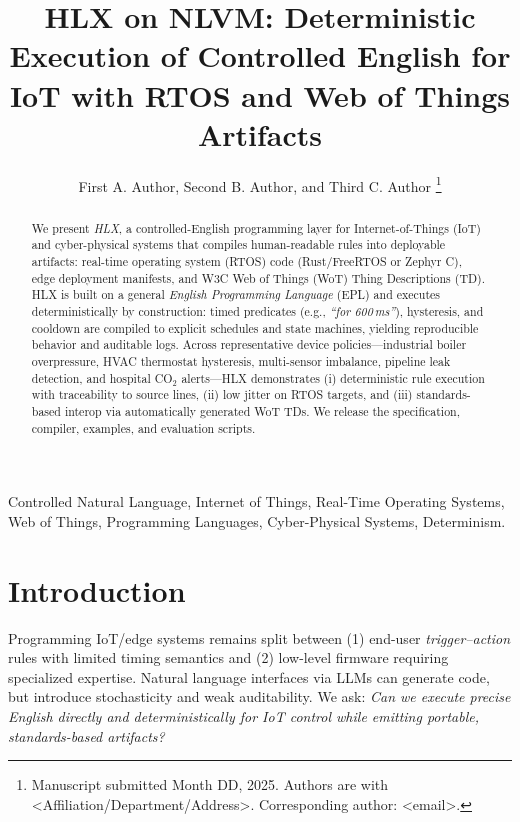 \documentclass[journal]{IEEEtran}
\begin{document}
\title{HLX on NLVM: Deterministic Execution of Controlled English for IoT with RTOS and Web of Things Artifacts}

\author{First A. Author, Second B. Author, and Third C. Author%
\thanks{Manuscript submitted Month DD, 2025. Authors are with <Affiliation/Department/Address>. Corresponding author: <email>.}}

\maketitle

\begin{abstract}
We present \emph{HLX}, a controlled-English programming layer for Internet-of-Things (IoT) and cyber-physical systems that compiles human-readable rules into deployable artifacts: real-time operating system (RTOS) code (Rust/FreeRTOS or Zephyr C), edge deployment manifests, and W3C Web of Things (WoT) Thing Descriptions (TD). HLX is built on a general \emph{English Programming Language} (EPL) and executes deterministically by construction: timed predicates (e.g., \emph{``for 600\,ms''}), hysteresis, and cooldown are compiled to explicit schedules and state machines, yielding reproducible behavior and auditable logs. Across representative device policies—industrial boiler overpressure, HVAC thermostat hysteresis, multi-sensor imbalance, pipeline leak detection, and hospital CO$_2$ alerts—HLX demonstrates (i) deterministic rule execution with traceability to source lines, (ii) low jitter on RTOS targets, and (iii) standards-based interop via automatically generated WoT TDs. We release the specification, compiler, examples, and evaluation scripts.
\end{abstract}

\begin{IEEEkeywords}
Controlled Natural Language, Internet of Things, Real-Time Operating Systems, Web of Things, Programming Languages, Cyber-Physical Systems, Determinism.
\end{IEEEkeywords}

\section{Introduction}
Programming IoT/edge systems remains split between (1) end-user \emph{trigger–action} rules with limited timing semantics and (2) low-level firmware requiring specialized expertise. Natural language interfaces via LLMs can generate code, but introduce stochasticity and weak auditability. We ask: \emph{Can we execute precise English directly and deterministically for IoT control while emitting portable, standards-based artifacts?}
\end{document}
